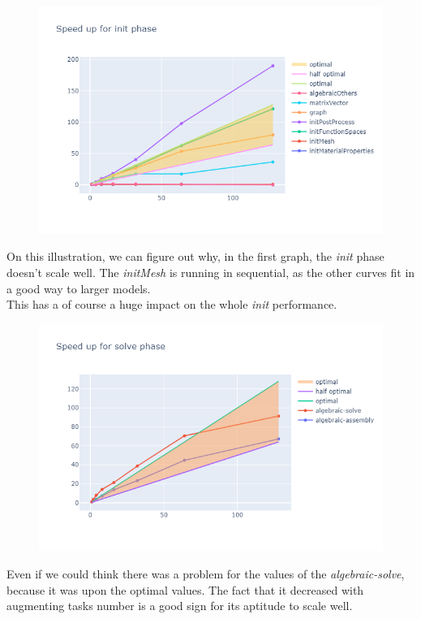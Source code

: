 \documentclass[12pt]{article}
\begin{document}
\begin{figure}[H]
    \centering
    \includegraphics[width=\textwidth]{../illustrations/gayaInit.png}
\end{figure}

On this illustration, we can figure out why, in the first graph, the \textit{init} phase doesn't scale well. 
The \textit{initMesh} is running in sequential, as the other curves fit in a good way to larger models. \\
This has a of course a huge impact on the whole \textit{init} performance.

\begin{figure}[H]
    \centering
    \includegraphics[width=\textwidth]{../illustrations/gayaSolve.png}
\end{figure}

Even if we could think there was a problem for the values of the \textit{algebraic-solve}, because it was upon the optimal values.
The fact that it decreased with augmenting tasks number is a good sign for its aptitude to scale well.
\end{document}
